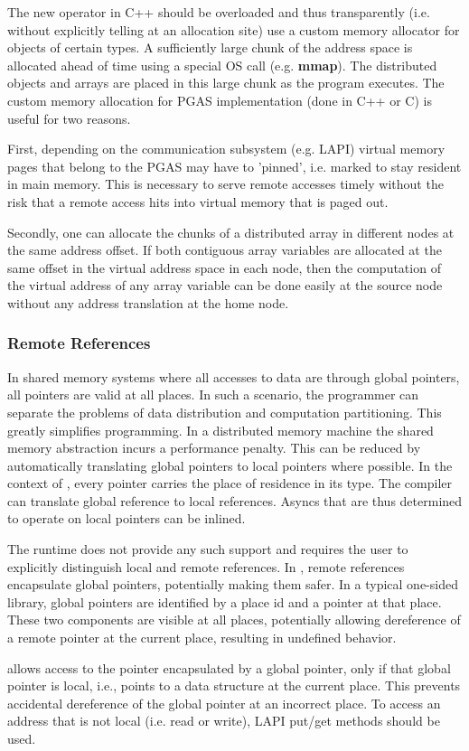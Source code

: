 The new operator in C++ should be overloaded and thus transparently
(i.e. without explicitly telling at an allocation site) use a custom
memory allocator for objects of certain types.  A sufficiently large
chunk of the address space is allocated ahead of time using a special OS
call (e.g. {\bf mmap}). The distributed objects and arrays are placed in
this large chunk as the program executes.  The custom memory allocation
for PGAS implementation (done in C++ or C) is useful for two reasons.

First, depending on the communication subsystem (e.g. LAPI) virtual
memory pages that belong to the PGAS may have to 'pinned', i.e. marked
to stay resident in main memory. This is necessary to serve remote
accesses timely without the risk that a remote access hits into virtual
memory that is paged out. 

Secondly, one can allocate the chunks of a distributed array in
different nodes at the same address offset. If both contiguous array
variables are allocated at the same offset in the virtual address space
in each node, then the computation of the virtual address of any array
variable can be done easily at the source node without any address
translation at the home node.

\subsubsection {Remote References}

In shared memory systems where all accesses to data are through global
pointers, all pointers are valid at all places. In such a scenario,
the programmer can separate the problems of data distribution and
computation partitioning. This greatly simplifies programming. In a
distributed memory machine the shared memory abstraction incurs a
performance penalty. This can be reduced by automatically translating
global pointers to local pointers where possible.  In the context of
\Xten, every pointer carries the place of residence in its type. The
compiler can translate global reference to local references. Asyncs
that are thus determined to operate on local pointers can be inlined.

The runtime does not provide any such support and requires the user to
explicitly distinguish local and remote references. In \Xtenlib, remote
references encapsulate global pointers, potentially making them
safer. In a typical one-sided library, global pointers are identified
by a place id and a pointer at that place. These two components are
visible at all places, potentially allowing dereference of a remote
pointer at the current place, resulting in undefined behavior.

\Xtenlib{} allows access to the pointer encapsulated by a global pointer,
only if that global pointer is local, i.e., points to a data structure
at the current place. This prevents accidental dereference of the
global pointer at an incorrect place. To access an address that is not
local (i.e. read or write), LAPI put/get methods should be used. 
